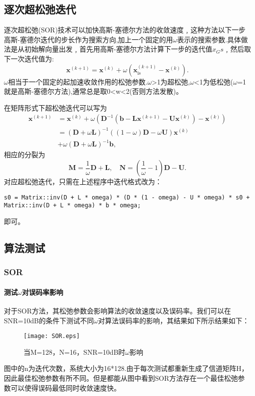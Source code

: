 \documentclass[twocolumn]{ctexart}
\begin{document}
\subsection{逐次超松弛迭代}
逐次超松弛(SOR)技术可以加快高斯-塞德尔方法的收敛速度﹐这种方法以下一步高斯-塞德尔迭代的步长作为搜索方向,加上一个固定的用$ \omega $表示的搜索参数.具体做法是从初始解向量出发﹐首先用高斯-塞德尔方法计算下一步的迭代值$ x_Gs $﹐然后取下一次迭代值为:
\[\boldsymbol{x}^{(k+1)}=\boldsymbol{x}^{(k)}+\omega\left(\boldsymbol{x}_{\mathrm{i} \mathrm{s}}^{(k+1)}-\boldsymbol{x}^{(k)}\right) .\]
$ \omega $相当于一个固定的起加速收敛作用的松弛参数.$ \omega $>1为超松弛,$ \omega $<1为低松弛($ \omega $=1就是高斯-塞德尔方法),通常总是取0<w<2(否则方法发散)。		
\par 在矩阵形式下超松弛迭代可以写为
$$
\begin{aligned}
\boldsymbol{x}^{(k+1)} &=\boldsymbol{x}^{(k)}+\omega\left(\boldsymbol{D}^{-1}\left(\boldsymbol{b}-\boldsymbol{L} \boldsymbol{x}^{(k+1)}-\boldsymbol{U} \boldsymbol{x}^{(k)}\right)-\boldsymbol{x}^{(k)}\right) \\
&=(\boldsymbol{D}+\omega \boldsymbol{L})^{-1}((1-\omega) \boldsymbol{D}-\omega \boldsymbol{U}) \boldsymbol{x}^{(k)}\\
&+\omega(\boldsymbol{D}+\omega \boldsymbol{L})^{-1} \boldsymbol{b},
\end{aligned}
$$
相应的分裂为
$$
\boldsymbol{M}=\frac{1}{\omega} \boldsymbol{D}+\boldsymbol{L}, \quad \boldsymbol{N}=\left(\frac{1}{\omega}-1\right) \boldsymbol{D}-\boldsymbol{U} .
$$
对应超松弛迭代，只需在上述程序中迭代格式改为：
\begin{lstlisting}
s0 = Matrix::inv(D + L * omega) * (D * (1 - omega) - U * omega) * s0 + Matrix::inv(D + L * omega) * b * omega;
\end{lstlisting}即可。
\subsection{算法测试}
\subsubsection{SOR}
\paragraph{测试$ \omega $对误码率影响}
对于SOR方法，其松弛参数会影响算法的收敛速度以及误码率。我们可以在SNR=10dB的条件下测试不同$ \omega $对算法误码率的影响，其结果如下所示结果如下：
\begin{figure}[htpb]
\centering
\texttt{[image: SOR.eps]}
\caption{当M=128，N=16，SNR=10dB时$ \omega $影响}
\end{figure}
图中的n为迭代次数，系统大小为16*128.由于每次测试都重新生成了信道矩阵H，因此最佳松弛参数有所不同。但是都能从图中看到SOR方法存在一个最佳松弛参数可以使得误码最低同时收敛速度快。
\end{document}
